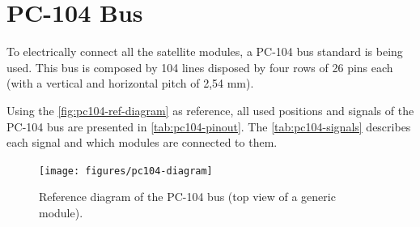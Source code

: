 \section{PC-104 Bus}

To electrically connect all the satellite modules, a PC-104 bus standard is being used. This bus is composed by 104 lines disposed by four rows of 26 pins each (with a vertical and horizontal pitch of 2,54 mm).

Using the \autoref{fig:pc104-ref-diagram} as reference, all used positions and signals of the PC-104 bus are presented in \autoref{tab:pc104-pinout}. The \autoref{tab:pc104-signals} describes each signal and which modules are connected to them.

\begin{figure}[!ht]
    \begin{center}
        \texttt{[image: figures/pc104-diagram]}
        \caption{Reference diagram of the PC-104 bus (top view of a generic module).}
        \label{fig:pc104-ref-diagram}
    \end{center}
\end{figure}

